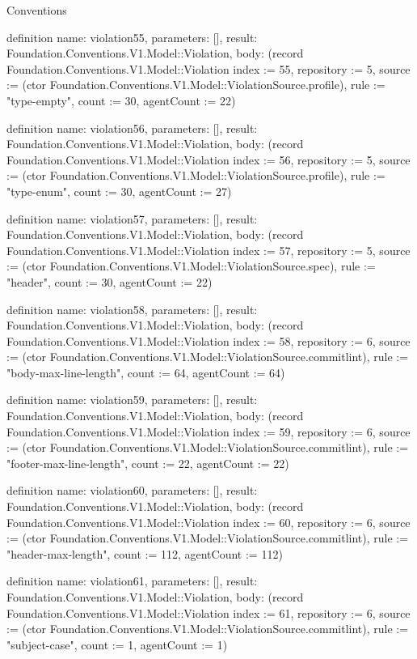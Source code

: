 \begin{lexlean}{Conventions}
\begin{semanticmodule}
definition{
  name: violation55,
  parameters: [],
  result: Foundation.Conventions.V1.Model::Violation,
  body: (record Foundation.Conventions.V1.Model::Violation {index := 55, repository := 5, source := (ctor Foundation.Conventions.V1.Model::ViolationSource.profile), rule := "type-empty", count := 30, agentCount := 22})
}

definition{
  name: violation56,
  parameters: [],
  result: Foundation.Conventions.V1.Model::Violation,
  body: (record Foundation.Conventions.V1.Model::Violation {index := 56, repository := 5, source := (ctor Foundation.Conventions.V1.Model::ViolationSource.profile), rule := "type-enum", count := 30, agentCount := 27})
}

definition{
  name: violation57,
  parameters: [],
  result: Foundation.Conventions.V1.Model::Violation,
  body: (record Foundation.Conventions.V1.Model::Violation {index := 57, repository := 5, source := (ctor Foundation.Conventions.V1.Model::ViolationSource.spec), rule := "header", count := 30, agentCount := 22})
}

definition{
  name: violation58,
  parameters: [],
  result: Foundation.Conventions.V1.Model::Violation,
  body: (record Foundation.Conventions.V1.Model::Violation {index := 58, repository := 6, source := (ctor Foundation.Conventions.V1.Model::ViolationSource.commitlint), rule := "body-max-line-length", count := 64, agentCount := 64})
}

definition{
  name: violation59,
  parameters: [],
  result: Foundation.Conventions.V1.Model::Violation,
  body: (record Foundation.Conventions.V1.Model::Violation {index := 59, repository := 6, source := (ctor Foundation.Conventions.V1.Model::ViolationSource.commitlint), rule := "footer-max-line-length", count := 22, agentCount := 22})
}

definition{
  name: violation60,
  parameters: [],
  result: Foundation.Conventions.V1.Model::Violation,
  body: (record Foundation.Conventions.V1.Model::Violation {index := 60, repository := 6, source := (ctor Foundation.Conventions.V1.Model::ViolationSource.commitlint), rule := "header-max-length", count := 112, agentCount := 112})
}

definition{
  name: violation61,
  parameters: [],
  result: Foundation.Conventions.V1.Model::Violation,
  body: (record Foundation.Conventions.V1.Model::Violation {index := 61, repository := 6, source := (ctor Foundation.Conventions.V1.Model::ViolationSource.commitlint), rule := "subject-case", count := 1, agentCount := 1})
}


\end{semanticmodule}
\end{lexlean}
